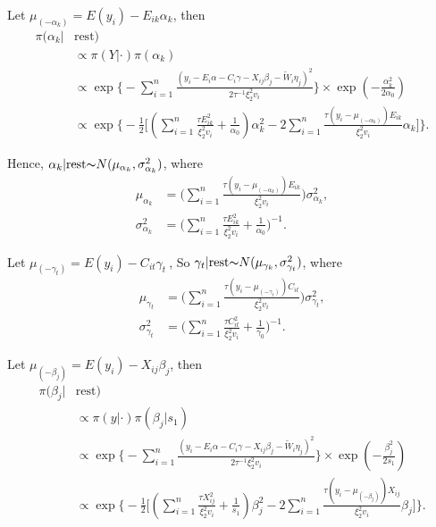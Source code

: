 \documentclass[12pt]{article}
\begin{document}
Let $\mu_{(-\alpha_k)}=E(y_i)-E_{ik}\alpha_k$, then
\begin{equation*}
\begin{aligned}
\pi(\alpha_k|& \text{rest}) \\
& \propto \pi(Y|\cdot) \pi(\alpha_k) \\
& \propto \exp\Big\{- \sum_{i=1}^{n}\frac{(y_i - E_i \alpha - C_i \gamma - X_{ij}\beta_{j} - \tilde{W}_{i}\eta_{j})^2}{2 \tau^{-1} \xi_{2}^{2} v_i} \Big\}
 \times\exp(-\frac{\alpha_{k}^2}{2 \alpha_0})\\
& \propto \exp\Big\{ -\frac{1}{2}\big[(\sum_{i=1}^{n} \frac{\tau E_{ik}^{2}}{\xi_{2}^{2} v_i}+\frac{1}{\alpha_0})\alpha_k^2 - 2\sum_{i=1}^{n}\frac{\tau(y_i-\mu_{(-\alpha_k)})E_{ik}}{\xi_2^2 v_i}\alpha_k\big]\Big\}.
\end{aligned}
\end{equation*}

Hence, $\alpha_k| \text{rest} {\thicksim} N(\mu_{\alpha_k}, \sigma_{\alpha_k}^{2})$, where
\begin{equation*}
\begin{aligned}
\mu_{\alpha_k} &= \big(\sum_{i=1}^{n}\frac{\tau(y_i-\mu_{(-\alpha_k)})E_{ik}}{\xi_2^2 v_i}\big)\sigma_{\alpha_k}^2,\\
\sigma_{\alpha_k}^{2} &= \big( \sum_{i=1}^{n} \frac{\tau E_{ik}^2}{\xi_2^2 v_i}+\frac{1}{\alpha_0}\big)^{-1}.
\end{aligned}
\end{equation*}

Let $\mu_{(-\gamma_t)}=E(y_i)-C_{it}\gamma_t\ $, So $\gamma_t| \text{rest} {\thicksim} N(\mu_{\gamma_k}, \sigma_{\gamma_t}^{2})$,
where 
\begin{equation*}\label{equr:meanm}
\begin{aligned}
\mu_{\gamma_t} &= \big(\sum_{i=1}^{n}\frac{\tau(y_i-\mu_{(-\gamma_t)})C_{it}}{\xi_2^2 v_i}\big)\sigma_{\gamma_t}^2,\\
\sigma_{\gamma_t}^{2} &= \big( \sum_{i=1}^{n} \frac{\tau C_{it}^2}{\xi_2^2 v_i}+\frac{1}{\gamma_0}\big)^{-1}.
\end{aligned}
\end{equation*}

Let $\mu_{(-\beta_j)}=E(y_i)-X_{ij}\beta_j $, then
\begin{equation*}
\begin{aligned}
\pi(\beta_j|& \text{rest}) \\
& \propto \pi(y|\cdot) \pi(\beta_j|s_1) \\
& \propto \exp\Big\{- \sum_{i=1}^{n}\frac{(y_i - E_i \alpha - C_i \gamma - X_{ij}\beta_{j} - \tilde{W}_{i}\eta_{j})^2}{2 \tau^{-1} \xi_{2}^{2} v_i} \Big\}
 \times\exp(-\frac{\beta_j^2}{2s_1})\\
& \propto \exp\Big\{ -\frac{1}{2}\big[(\sum_{i=1}^{n} \frac{\tau X_{ij}^{2}}{\xi_{2}^{2} v_i}+\frac{1}{s_1})\beta_j^2 - 2\sum_{i=1}^{n}\frac{\tau(y_i-\mu_{(-\beta_j)})X_{ij}}{\xi_2^2 v_i}\beta_j\big]\Big\}.
\end{aligned}
\end{equation*}
\end{document}
